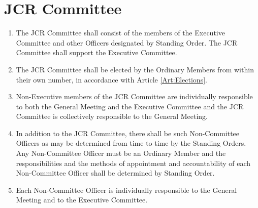 \documentclass[11pt,a4paper, oneside]{memoir}
\begin{document}
	\section{JCR Committee} \label{Art:JCRComm}
	\begin{enumerate}
		\item The JCR Committee shall consist of the members of the Executive Committee and other Officers designated by Standing Order.
		The JCR Committee shall support the Executive Committee.
		\item The JCR Committee shall be elected by the Ordinary Members from within their own number, in accordance with Article \ref{Art:Elections}.
		\item Non-Executive members of the JCR Committee are individually responsible to both the General Meeting and the Executive Committee and the JCR Committee is collectively responsible to the General Meeting. 
		\item In addition to the JCR Committee, there shall be such Non-Committee Officers as may be determined from time to time by the Standing Orders.
		Any Non-Committee Officer must be an Ordinary Member and the responsibilities and the methods of appointment and accountability of each Non-Committee Officer shall be determined by Standing Order.
		\item Each Non-Committee Officer is individually responsible to the General Meeting and to the Executive Committee.
	\end{enumerate}
		
		
\end{document}
